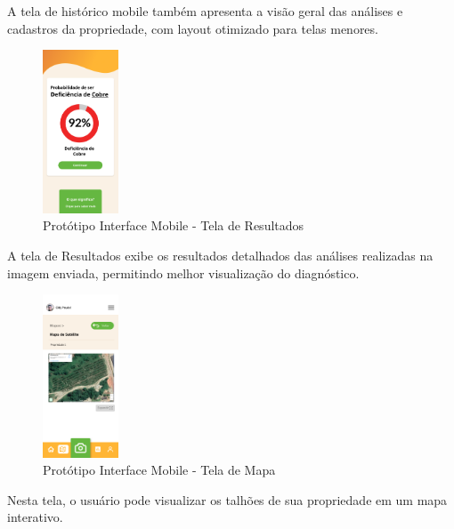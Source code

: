 A tela de histórico mobile também apresenta a visão geral das análises e cadastros da 
propriedade, com layout otimizado para telas menores.
\medskip



\begin{figure}[H]
\centering
\caption{Protótipo Interface Mobile - Tela de Resultados}
\label{fig:interface-mobile-tela-resultados}
\includegraphics[width=0.2\textwidth]{Images/MobileResultado.png}
\end{figure}

A tela de Resultados exibe os resultados detalhados das análises realizadas na
imagem enviada, permitindo melhor visualização do diagnóstico.
\medskip


\begin{figure}[H]
\centering
\caption{Protótipo Interface Mobile - Tela de Mapa}
\label{fig:interface-mobile-tela-mapa}
\includegraphics[width=0.2\textwidth]{Images/MobileMapa.png}
\end{figure}

Nesta tela, o usuário pode visualizar os talhões de sua propriedade em um
mapa interativo.
\medskip